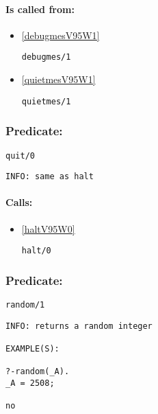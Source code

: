 \paragraph{Is called from:} 
\begin{itemize}
\item \ref{debugmesV95W1} 
\begin{verbatim}
debugmes/1
\end{verbatim}

\item \ref{quietmesV95W1} 
\begin{verbatim}
quietmes/1
\end{verbatim}

\end{itemize}

\subsubsection{Predicate:} \label{quitV95W0}

\begin{verbatim}
quit/0
\end{verbatim}

{\small \begin{verbatim}
INFO: same as halt

\end{verbatim}}
\paragraph{Calls:} 
\begin{itemize}
\item \ref{haltV95W0} 
\begin{verbatim}
halt/0
\end{verbatim}

\end{itemize}

\subsubsection{Predicate:} \label{randomV95W1}

\begin{verbatim}
random/1
\end{verbatim}

{\small \begin{verbatim}
INFO: returns a random integer

EXAMPLE(S):

?-random(_A).
_A = 2508;

no

\end{verbatim}}


